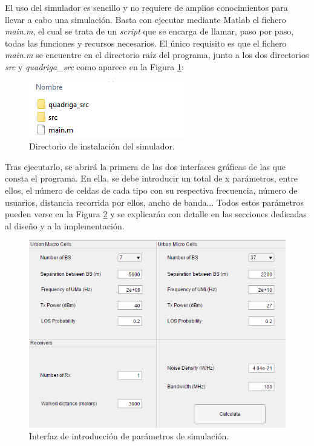 El uso del simulador es sencillo y no requiere de amplios conocimientos para llevar a cabo una simulación. Basta con ejecutar mediante Matlab el fichero \textit{main.m}, el cual se trata de un \textit{script} que se encarga de llamar, paso por paso, todas las funciones y recursos necesarios. El único requisito es que el fichero \textit{main.m} se encuentre en el directorio raíz del programa, junto a los dos directorios \textit{src} y \textit{quadriga\_src} como aparece en la Figura \ref{fig:directorio}:

\begin{figure}[h!]
	\centering
    \includegraphics{imagenes/directorio.PNG}
	\caption{Directorio de instalación del simulador.}
	\label{fig:directorio}
\end{figure}

Tras ejecutarlo, se abrirá la primera de las dos interfaces gráficas de las que consta el programa. En ella, se debe introducir un total de x parámetros, entre ellos, el número de celdas de cada tipo con su respectiva frecuencia, número de usuarios, distancia recorrida por ellos, ancho de banda... Todos estos parámetros pueden verse en la Figura \ref{fig:interfaz_parametros} y se explicarán con detalle en las secciones dedicadas al diseño y a la implementación.

\begin{figure}[h!]
	\centering
    \includegraphics[width=\linewidth]{imagenes/interfaz_parametros.PNG}
	\caption{Interfaz de introducción de parámetros de simulación.}
	\label{fig:interfaz_parametros}
\end{figure}


